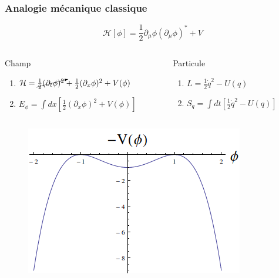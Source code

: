 \documentclass[handout]{beamer}
\begin{document}
\begin{frame} \frametitle{Analogie mécanique classique}
\begin{equation*}
\mathcal{H}[\phi] = \frac{1}{2} \partial_\mu \phi (\partial_\mu \phi)^* +V
\end{equation*}
\begin{columns}[T]
    \begin{column}[T]{.55\linewidth}
    Champ
    \begin{enumerate}
    \item $\mathcal{H} =  \cancelto{}{\frac{1}{2}  (\partial_t \phi)^2} +  \frac{1}{2}  (\partial_x \phi)^2 +V(\phi) $
    \item $E_\phi = \int{dx\left[\frac{1}{2}  (\partial_x \phi)^2 +V(\phi) \right]}$
    \end{enumerate}
    \end{column}
    \begin{column}[T]{.45\linewidth}
	Particule
    \begin{enumerate}
    \item $L =   \frac{1}{2}  \dot{q}^2 -U(q)$
    \item $S_q = \int{dt[\frac{1}{2}  \dot{q}^2 -U(q)] }$
    \end{enumerate}
    \end{column}
  \end{columns}
  \begin{figure}
\includegraphics[scale=0.5]{pot_inv.png}
\end{figure}
% 


  
\end{frame}
\end{document}
